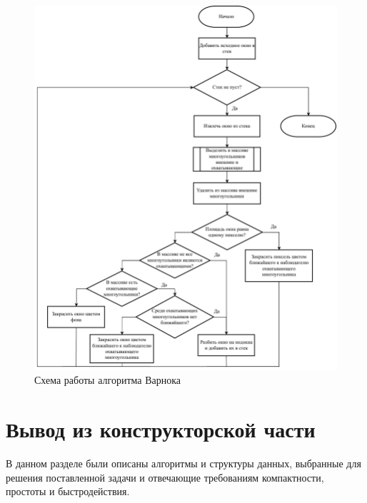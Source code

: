 \begin{figure}[H]
	\centering
	\includegraphics[height=0.75\textheight]{inc/img/warnock.pdf}
	\caption{Схема работы алгоритма Варнока}
	\label{fig:warnock}
\end{figure}

\section{Вывод из конструкторской части}
В данном разделе были описаны алгоритмы и структуры данных, выбранные для решения поставленной задачи и отвечающие требованиям компактности, простоты и быстродействия. 
